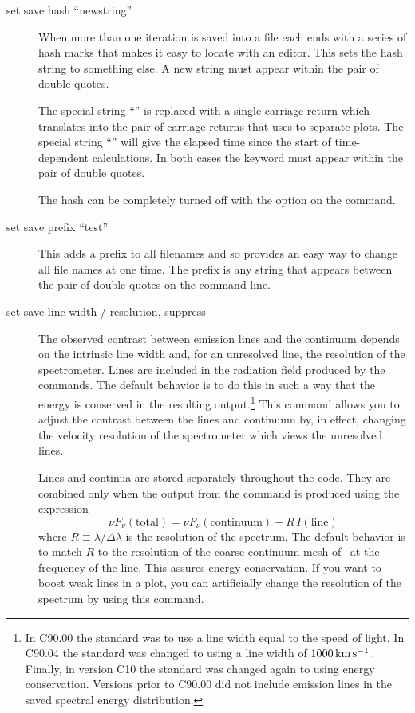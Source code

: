 \begin{description}
\item[set save hash ``newstring'']
\label{sec:CommandSetSaveHash}
When more than one iteration is saved
into a file each ends with a series of hash marks that makes it easy to
locate with an editor.
This sets the hash string to something else.  A
new string must appear within the pair of double quotes.

The special string ``'' is replaced
with a single carriage return
which translates into the pair of carriage returns that  uses to
separate plots.
The special string ``'' will give the elapsed time
since the start of time-dependent calculations.
In both cases the keyword
must appear within the pair of double quotes.

The hash can be completely turned off with the 
option on the  command.

\item[set save prefix ``test'']  This adds a prefix
to all filenames and so
provides an easy way to change all file names at one time.
The prefix is any string that appears between the pair of
double quotes on the command line.

\item[set save line width / resolution, suppress]
\label{sec:CommandSetSaveLWidth}
The observed contrast between emission
lines and the continuum depends on the intrinsic line width and,
for an
unresolved line, the resolution of the spectrometer.
Lines are included
in the radiation field produced by the 
commands. The default behavior is to do this in such a way that
the energy is conserved in the resulting output.\footnote{In C90.00 the
standard was to use a line width equal to the speed of light. In C90.04 the
standard was changed to using a line width of $1000 \mbox{${\rm\thinspace km}{\rm\thinspace s^{-1}}\,$}$. Finally, in
version C10 the standard was changed again to using energy conservation.
Versions prior to C90.00 did not include emission lines in the saved
spectral energy distribution.}
This command allows you to adjust the contrast between the lines and continuum by,
in effect, changing the velocity resolution of the spectrometer which views
the unresolved lines.

Lines and continua are stored separately throughout the code.
They are
combined only when the output from the  command is produced using the expression
\begin{equation}
\nu F_\nu  ({\mathrm{total}}) = \nu F_\nu  ({\mathrm{continuum}}) +
R \, I\left( {{\mathrm{line}}} \right)
\label{eqn:LineContinuumContrastFactor}
\end{equation}
where $R \equiv \lambda/\Delta\lambda$ is the resolution of the spectrum. The
default behavior is to match $R$ to the resolution of the coarse continuum
mesh of \Cloudy\ at the frequency of the line. This assures energy
conservation. If you want to boost weak lines in a plot, you can artificially
change the resolution of the spectrum by using this command.


\end{description}
